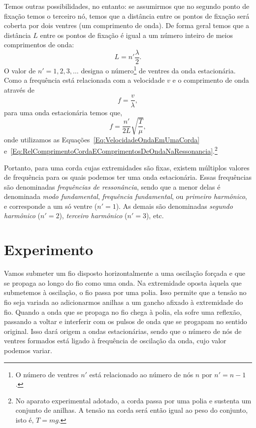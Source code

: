 Temos outras possibilidades, no entanto: se assumirmos que no segundo ponto de fixação temos o terceiro nó, temos que a distância entre os pontos de fixação será coberta por dois ventres (um comprimento de onda). De forma geral temos que a distância $L$ entre os pontos de fixação é igual a um número inteiro de meios comprimentos de onda:
\begin{equation}\label{Eq:RelComprimentoCordaEComprimentosDeOndaNaRessonancia}
    L = n'\frac{\lambda}{2}.
\end{equation}
%
O valor de $n' = 1, 2, 3, \dots$ designa o número\footnote{O número de ventres $n'$ está relacionado ao número de nós $n$ por $n'=n-1$.} de ventres da onda estacionária. Como a frequência está relacionada com a velocidade $v$ e o comprimento de onda através de
\begin{equation}
	f = \frac{v}{\lambda},
\end{equation}
%
para uma onda estacionária temos que,
\begin{equation}\label{Eq:RelacaoVariaveisOndasEstacionarias}
	f = \frac{n'}{2L}\sqrt{\frac{T}{\mu}},
\end{equation}
%
onde utilizamos as Equações~\eqref{Eq:VelocidadeOndaEmUmaCorda} e~\eqref{Eq:RelComprimentoCordaEComprimentosDeOndaNaRessonancia}.\footnote{No aparato experimental adotado, a corda passa por uma polia e sustenta um conjunto de anilhas. A tensão na corda será então igual ao peso do conjunto, isto é, $T = mg$.}

Portanto, para uma corda cujas extremidades são fixas, existem múltiplos valores de frequência para os quais podemos ter uma onda estacionária. Essas frequências são denominadas \emph{frequências de ressonância}, sendo que a menor delas é denominada \emph{modo fundamental}, \emph{frequência fundamental}, ou \emph{primeiro harmônico}, e corresponde a um só ventre ($n'=1$). As demais são denominadas \emph{segundo harmônico} ($n'=2$), \emph{terceiro harmônico} ($n'=3$), etc.

\section{Experimento}

Vamos submeter um fio disposto horizontalmente a uma oscilação forçada e que se propaga ao longo do fio como uma onda. Na extremidade oposta àquela que submetemos à oscilação, o fio passa por uma polia. Isso permite que a tensão no fio seja variada ao adicionarmos anilhas a um gancho afixado à extremidade do fio. Quando a onda que se propaga no fio chega à polia, ela sofre uma reflexão, passando a voltar e interferir com os pulsos de onda que se progapam no sentido original. Isso dará origem a ondas estacionárias, sendo que o número de nós de ventres formados está ligado à frequência de oscilação da onda, cujo valor podemos variar.

